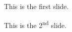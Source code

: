 \documentclass[]{beamer}
\begin{document}
\begin{frame}
	This is the first slide.
\end{frame}

\begin{frame}
	This is the 2\textsuperscript{nd} slide.
\end{frame}
\end{document}
